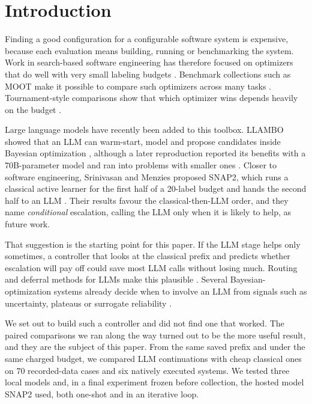 \section{Introduction}

Finding a good configuration for a configurable software system is expensive, because each evaluation means building, running or benchmarking the system. Work in search-based software engineering has therefore focused on optimizers that do well with very small labeling budgets \cite{harman2001sbse,nair2020flash,menzies2026ezr}. Benchmark collections such as MOOT make it possible to compare such optimizers across many tasks \cite{menzies2025moot}. Tournament-style comparisons show that which optimizer wins depends heavily on the budget \cite{ganguly2026tournament}.

Large language models have recently been added to this toolbox. LLAMBO showed that an LLM can warm-start, model and propose candidates inside Bayesian optimization \cite{liu2024llambo}, although a later reproduction reported its benefits with a 70B-parameter model and ran into problems with smaller ones \cite{rychert2025reproduction}. Closer to software engineering, Srinivasan and Menzies proposed SNAP2, which runs a classical active learner for the first half of a 20-label budget and hands the second half to an LLM \cite{srinivasan2026snap2}. Their results favour the classical-then-LLM order, and they name \emph{conditional} escalation, calling the LLM only when it is likely to help, as future work.

That suggestion is the starting point for this paper. If the LLM stage helps only sometimes, a controller that looks at the classical prefix and predicts whether escalation will pay off could save most LLM calls without losing much. Routing and deferral methods for LLMs make this plausible \cite{chen2023frugalgpt,ong2024routellm,mozannar2020defer}. Several Bayesian-optimization systems already decide when to involve an LLM from signals such as uncertainty, plateaus or surrogate reliability \cite{cisse2025bora,xu2026lbmcts,ngo2026lmabo}.

We set out to build such a controller and did not find one that worked. The paired comparisons we ran along the way turned out to be the more useful result, and they are the subject of this paper. From the same saved prefix and under the same charged budget, we compared LLM continuations with cheap classical ones on 70 recorded-data cases and six natively executed systems. We tested three local models and, in a final experiment frozen before collection, the hosted model SNAP2 used, both one-shot and in an iterative loop.

